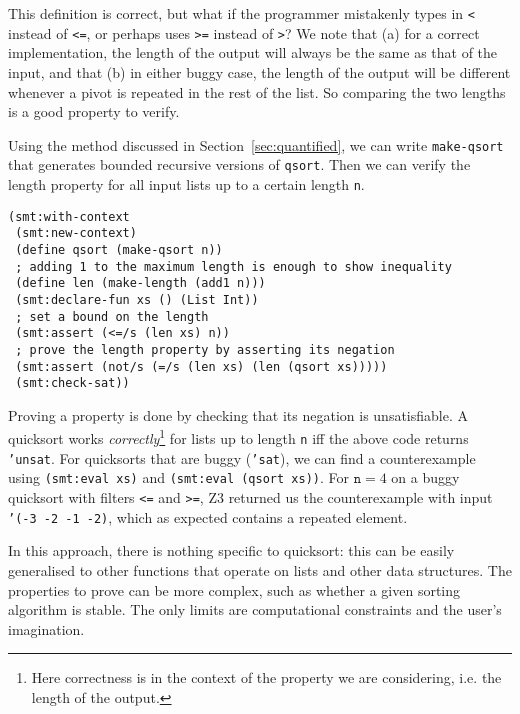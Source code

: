 This definition is correct, but what if the programmer mistakenly types in
\texttt{<} instead of \texttt{<=}, or perhaps uses \texttt{>=} instead of
\texttt{>}? We note that (a) for a correct implementation, the length of the
output will always be the same as that of the input, and that (b) in either
buggy case, the length of the output will be different whenever a pivot is
repeated in the rest of the list. So comparing the two lengths is a good
property to verify.

Using the method discussed in Section~\ref{sec:quantified}, we can write
\texttt{make-qsort} that generates bounded recursive versions of
\texttt{qsort}. Then we can verify the length property for all input lists up
to a certain length \texttt{n}.

\begin{verbatim}
(smt:with-context
 (smt:new-context)
 (define qsort (make-qsort n))
 ; adding 1 to the maximum length is enough to show inequality
 (define len (make-length (add1 n)))
 (smt:declare-fun xs () (List Int))
 ; set a bound on the length
 (smt:assert (<=/s (len xs) n))
 ; prove the length property by asserting its negation
 (smt:assert (not/s (=/s (len xs) (len (qsort xs)))))
 (smt:check-sat))
\end{verbatim}

Proving a property is done by checking that its negation is unsatisfiable. A
quicksort works \textit{correctly}\footnote{Here correctness is in the context
of the property we are considering, i.e. the length of the output.} for lists
up to length \texttt{n} iff the above code returns \texttt{'unsat}. For
quicksorts that are buggy (\texttt{'sat}), we can find a counterexample using
\texttt{(smt:eval xs)} and \texttt{(smt:eval (qsort xs))}. For $\mathtt{n}=4$
on a buggy quicksort with filters \texttt{<=} and \texttt{>=}, Z3 returned us
the counterexample with input \texttt{'(-3 -2 -1 -2)}, which as expected
contains a repeated element.

In this approach, there is nothing specific to quicksort: this can be easily
generalised to other functions that operate on lists and other data
structures. The properties to prove can be more complex, such as whether a
given sorting algorithm is stable. The only limits are computational
constraints and the user's imagination.
